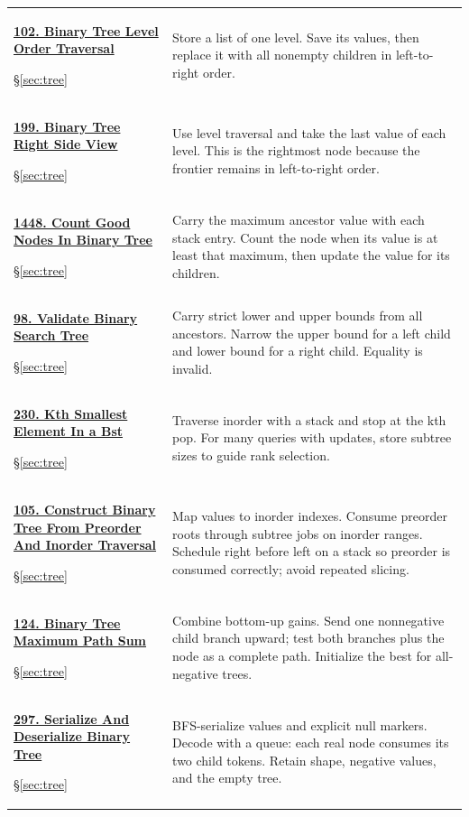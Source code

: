 \documentclass[11pt]{article}
\newcommand{\sect}[1]{\hyperref[sec:#1]{\S\ref*{sec:#1}}}
\begin{document}
\begin{longtable}{@{}L{4.3cm}L{11.7cm}@{}}
\hypertarget{lc102}{}\href{https://leetcode.com/problems/binary-tree-level-order-traversal/}{\textbf{102. Binary Tree Level Order Traversal}}\par\sect{tree} & Store a list of one level. Save its values, then replace it with all nonempty children in left-to-right order.\\[4pt]
\hypertarget{lc199}{}\href{https://leetcode.com/problems/binary-tree-right-side-view/}{\textbf{199. Binary Tree Right Side View}}\par\sect{tree} & Use level traversal and take the last value of each level. This is the rightmost node because the frontier remains in left-to-right order.\\[4pt]
\hypertarget{lc1448}{}\href{https://leetcode.com/problems/count-good-nodes-in-binary-tree/}{\textbf{1448. Count Good Nodes In Binary Tree}}\par\sect{tree} & Carry the maximum ancestor value with each stack entry. Count the node when its value is at least that maximum, then update the value for its children.\\[4pt]
\hypertarget{lc98}{}\href{https://leetcode.com/problems/validate-binary-search-tree/}{\textbf{98. Validate Binary Search Tree}}\par\sect{tree} & Carry strict lower and upper bounds from all ancestors. Narrow the upper bound for a left child and lower bound for a right child. Equality is invalid.\\[4pt]
\hypertarget{lc230}{}\href{https://leetcode.com/problems/kth-smallest-element-in-a-bst/}{\textbf{230. Kth Smallest Element In a Bst}}\par\sect{tree} & Traverse inorder with a stack and stop at the kth pop. For many queries with updates, store subtree sizes to guide rank selection.\\[4pt]
\hypertarget{lc105}{}\href{https://leetcode.com/problems/construct-binary-tree-from-preorder-and-inorder-traversal/}{\textbf{105. Construct Binary Tree From Preorder And Inorder Traversal}}\par\sect{tree} & Map values to inorder indexes. Consume preorder roots through subtree jobs on inorder ranges. Schedule right before left on a stack so preorder is consumed correctly; avoid repeated slicing.\\[4pt]
\hypertarget{lc124}{}\href{https://leetcode.com/problems/binary-tree-maximum-path-sum/}{\textbf{124. Binary Tree Maximum Path Sum}}\par\sect{tree} & Combine bottom-up gains. Send one nonnegative child branch upward; test both branches plus the node as a complete path. Initialize the best for all-negative trees.\\[4pt]
\hypertarget{lc297}{}\href{https://leetcode.com/problems/serialize-and-deserialize-binary-tree/}{\textbf{297. Serialize And Deserialize Binary Tree}}\par\sect{tree} & BFS-serialize values and explicit null markers. Decode with a queue: each real node consumes its two child tokens. Retain shape, negative values, and the empty tree.\\[4pt]
\bottomrule
\end{longtable}
\end{document}
